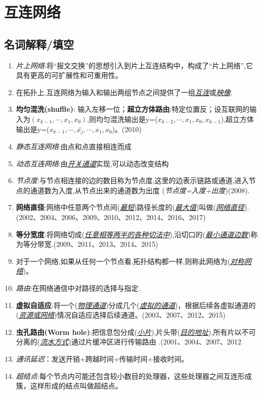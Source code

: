 \documentclass[a4paper]{ctexart}
\newcommand{\blank}[1]{(\emph{\underline{#1}})}
\begin{document}
\newpage
\section{互连网络}
\subsection{名词解释/填空}
\begin{enumerate}
  \item \emph{片上网络}:将“报文交换”的思想引入到片上互连结构中，构成了“片上网络”,它具有更高的可扩展性和可重用性。
  \item 在拓扑上,互连网络为输入和输出两组节点之间提供了一组\emph{\underline{互连}}或\emph{\underline{映像}}.
  \item \textbf{均匀混洗(shuffle)}: 输入左移一位；\textbf{超立方体路由}:特定位置反；设互联网的输入为$(x_{k-1},\cdots,x_1,x_0)$,则均匀混洗输出是y=\blank{$x_{k-2},\cdots,x_1,x_0,x_{k-1}$},超立方体输出是y=\blank{$x_{k-1},\cdots,\bar{x_j},\cdots,x_1,x_0$}。(2010)
  \item \emph{静态互连网络}:由点和点直接相连而成
  \item \emph{动态互连网络}:由\underline{\emph{开关通道}}实现,可以动态改变结构
  \item \emph{节点度}:与节点相连接的边的数目称为节点度,这里的边表示链路或通道,进入节点的通道数为入度,从节点出来的通道数为出度
  (\emph{节点度=入度+出度})(2008).
  \item \textbf{网络直径}:网络中任意两个节点间\blank{最短}路径长度的\blank{最大值}叫做(\emph{\underline{网络直径}}).(2002、2004、2006、2009、2010、2012、2014、2016、2017)
  \item \textbf{等分宽度}:将网络切成\blank{任意相等两半的各种切法中},沿切口的\blank{最小通道边数}称为等分带宽.(2009、2011、2013、2014、2015)
  \item 对于一个网络,如果从任何一个节点看,拓扑结构都一样,则称此网络为\blank{对称网络}。
  \item \emph{路由}:在网络通信中对路径的选择与指定.
  \item \textbf{虚拟自适应}:将一个\blank{物理通道}分成几个\blank{虚拟的通道}，根据后续各虚拟通道的\blank{资源或网络}情况自适应选择后续通道。(2003、2007、2012、2015)
  \item \textbf{虫孔路由(Worm hole)}:把信息包分成(\emph{\underline{小片}}),片头带(\emph{\underline{目的地址}}),所有片以不可分离的(\emph{\underline{流水方式}})通过片缓冲区进行传输路由 .(2001、2004、2007、2012
  \item \emph{通讯延迟}：发送开销+跨越时间+传输时间+接收时间。
  \item \emph{超结点}:每个节点内可能还包含较小数目的处理器，这些处理器之间互连形成簇，这样形成的结点叫做超结点。
\end{enumerate}
\end{document}
